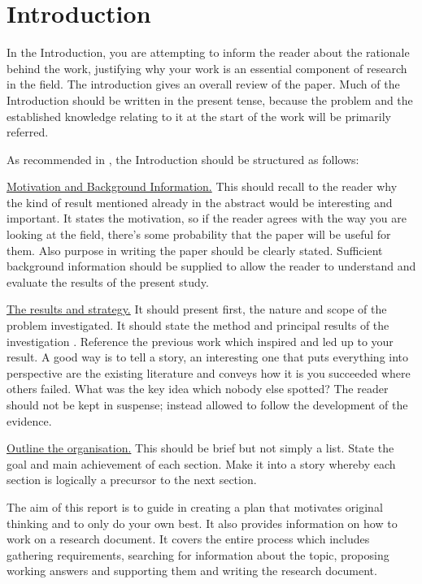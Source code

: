 \chapter{Introduction}

In the Introduction, you are attempting to inform the reader about the rationale
behind the work, justifying why your work is an essential component of research
in the field. The introduction gives an overall review of the paper. Much  of 
the Introduction  should  be  written  in  the  present  tense, because  the  problem  and  the established  knowledge relating  to  it  at  the  start
of  the  work will  be primarily referred.

As recommended in \cite{Majid1993}, the Introduction should be structured as
follows:

 \uline {Motivation and Background Information.}
 This should recall to the reader why the kind of result mentioned already in
 the abstract would be interesting and important. 
 It states the motivation, so if the reader agrees with the way you are
 looking at the field, there's some probability that the paper will be useful
 for them. Also purpose in writing the paper should be clearly stated.
 Sufficient  background  information should be supplied to  allow the  reader  
to understand  and  evaluate the  results  of  the  present study.
\par  \uline{The results and strategy.}
 It should present first, the nature and scope of the  problem  investigated.
 It should state the method and principal results of the investigation
 \cite{Day2012}. Reference the previous work which inspired and led up to your
 result. A good way is to tell a story, an interesting one that puts everything
 into perspective are the existing literature and conveys how it is you succeeded where others
failed. What was the key idea which nobody else spotted? The reader should not
be kept in suspense; instead allowed to follow the development of the evidence.
 
\par \uline{Outline the organisation.}
This should be brief but not simply a list. State the goal and main achievement
of each section. Make it into a story whereby each section is logically a
precursor to the next section. 

The aim of this report is to guide in creating a plan that motivates original thinking and
 to only do your own best. It also provides information on how to work on
 a research document. It covers the entire process which includes
 gathering requirements, searching for information about the topic,
 proposing working answers and supporting them and writing the research
 document.

